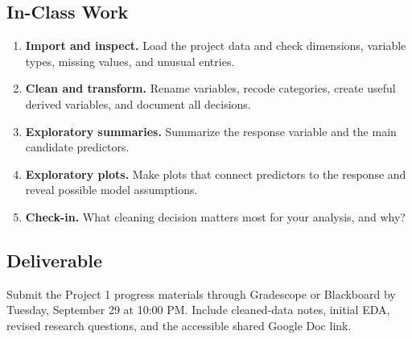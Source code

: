 \documentclass{article}
\newcommand{\submissionplatform}{Gradescope or Blackboard}
\newcommand{\duedate}{Tuesday, September 29 at 10:00 PM}
\begin{document}
\subsection*{In-Class Work}
\begin{enumerate}[label={\bfseries (\Alph*)},itemsep=.5em]
  \item \textbf{Import and inspect.} Load the project data and check dimensions, variable types, missing values, and unusual entries.
  \item \textbf{Clean and transform.} Rename variables, recode categories, create useful derived variables, and document all decisions.
  \item \textbf{Exploratory summaries.} Summarize the response variable and the main candidate predictors.
  \item \textbf{Exploratory plots.} Make plots that connect predictors to the response and reveal possible model assumptions.
  \item \textbf{Check-in.} What cleaning decision matters most for your analysis, and why?
\end{enumerate}

\subsection*{Deliverable}
Submit the Project 1 progress materials through \submissionplatform{} by \duedate{}. Include cleaned-data notes, initial EDA, revised research questions, and the accessible shared Google Doc link.
\end{document}
